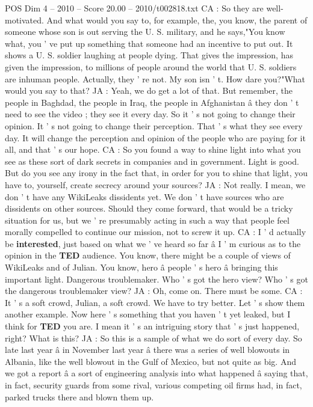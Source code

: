 \begin{textsample}{POS Dim 4 – 2010 – Score 20.00 – 2010/t002818.txt}
CA : So they are well-motivated.
And what would you say to, for example, the, you know, the parent of someone whose son is out serving the U.
S. military, and he says,"You know what, you ' ve put up something that someone had an incentive to put out.
It shows a U.
S. soldier laughing at people dying.
That gives the impression, has given the impression, to millions of people around the world that U.
S. soldiers are inhuman people.
Actually, they ' re not.
My son isn ' t.
How dare you?"What would you say to that?
JA : Yeah, we do get a lot of that.
But remember, the people in Baghdad, the people in Iraq, the people in Afghanistan â they don ' t need to see the video ; they see it every day.
So it ' s not going to change their opinion.
It ' s not going to change their perception.
That ' s what they see every day.
It will change the perception and opinion of the people who are paying for it all, and that ' s our hope.
CA : So you found a way to shine light into what you see as these sort of dark secrets in companies and in government.
Light is good.
But do you see any irony in the fact that, in order for you to shine that light, you have to, yourself, create secrecy around your sources?
JA : Not really.
I mean, we don ' t have any WikiLeaks dissidents yet.
We don ' t have sources who are dissidents on other sources.
Should they come forward, that would be a tricky situation for us, but we ' re presumably acting in such a way that people feel morally compelled to continue our mission, not to screw it up.
CA : I ' d actually be \textbf{interested}, just based on what we ' ve heard so far â I ' m curious as to the opinion in the \textbf{TED} audience.
You know, there might be a couple of views of WikiLeaks and of Julian.
You know, hero â people ' s hero â bringing this important light.
Dangerous troublemaker.
Who ' s got the hero view?
Who ' s got the dangerous troublemaker view?
JA : Oh, come on.
There must be some.
CA : It ' s a soft crowd, Julian, a soft crowd.
We have to try better.
Let ' s show them another example.
Now here ' s something that you haven ' t yet leaked, but I think for \textbf{TED} you are.
I mean it ' s an intriguing story that ' s just happened, right?
What is this?
JA : So this is a sample of what we do sort of every day.
So late last year â in November last year â there was a series of well blowouts in Albania, like the well blowout in the Gulf of Mexico, but not quite as big.
And we got a report â a sort of engineering analysis into what happened â saying that, in fact, security guards from some rival, various competing oil firms had, in fact, parked trucks there and blown them up.

\end{textsample}

